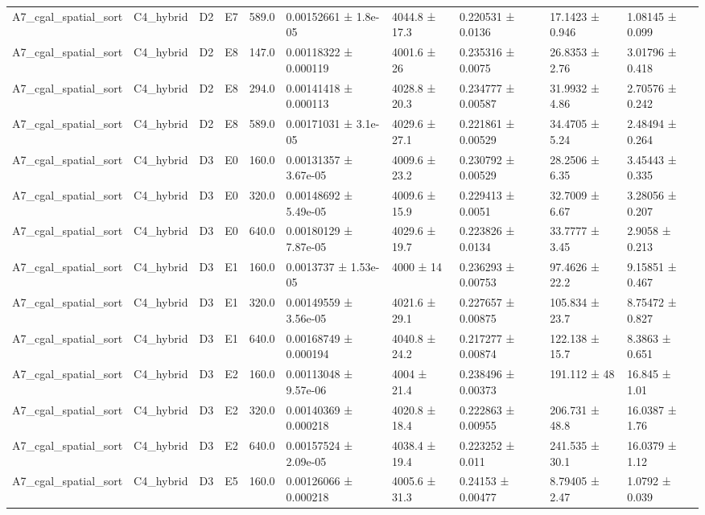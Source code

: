 \begin{table}
\begin{tabular}{llllllllll}
A7\_cgal\_spatial\_sort & C4\_hybrid & D2 & E7 & 589.0 & 0.00152661 ± 1.8e-05 & 4044.8 ± 17.3 & 0.220531 ± 0.0136 & 17.1423 ± 0.946 & 1.08145 ± 0.099 \\
A7\_cgal\_spatial\_sort & C4\_hybrid & D2 & E8 & 147.0 & 0.00118322 ± 0.000119 & 4001.6 ± 26 & 0.235316 ± 0.0075 & 26.8353 ± 2.76 & 3.01796 ± 0.418 \\
A7\_cgal\_spatial\_sort & C4\_hybrid & D2 & E8 & 294.0 & 0.00141418 ± 0.000113 & 4028.8 ± 20.3 & 0.234777 ± 0.00587 & 31.9932 ± 4.86 & 2.70576 ± 0.242 \\
A7\_cgal\_spatial\_sort & C4\_hybrid & D2 & E8 & 589.0 & 0.00171031 ± 3.1e-05 & 4029.6 ± 27.1 & 0.221861 ± 0.00529 & 34.4705 ± 5.24 & 2.48494 ± 0.264 \\
A7\_cgal\_spatial\_sort & C4\_hybrid & D3 & E0 & 160.0 & 0.00131357 ± 3.67e-05 & 4009.6 ± 23.2 & 0.230792 ± 0.00529 & 28.2506 ± 6.35 & 3.45443 ± 0.335 \\
A7\_cgal\_spatial\_sort & C4\_hybrid & D3 & E0 & 320.0 & 0.00148692 ± 5.49e-05 & 4009.6 ± 15.9 & 0.229413 ± 0.0051 & 32.7009 ± 6.67 & 3.28056 ± 0.207 \\
A7\_cgal\_spatial\_sort & C4\_hybrid & D3 & E0 & 640.0 & 0.00180129 ± 7.87e-05 & 4029.6 ± 19.7 & 0.223826 ± 0.0134 & 33.7777 ± 3.45 & 2.9058 ± 0.213 \\
A7\_cgal\_spatial\_sort & C4\_hybrid & D3 & E1 & 160.0 & 0.0013737 ± 1.53e-05 & 4000 ± 14 & 0.236293 ± 0.00753 & 97.4626 ± 22.2 & 9.15851 ± 0.467 \\
A7\_cgal\_spatial\_sort & C4\_hybrid & D3 & E1 & 320.0 & 0.00149559 ± 3.56e-05 & 4021.6 ± 29.1 & 0.227657 ± 0.00875 & 105.834 ± 23.7 & 8.75472 ± 0.827 \\
A7\_cgal\_spatial\_sort & C4\_hybrid & D3 & E1 & 640.0 & 0.00168749 ± 0.000194 & 4040.8 ± 24.2 & 0.217277 ± 0.00874 & 122.138 ± 15.7 & 8.3863 ± 0.651 \\
A7\_cgal\_spatial\_sort & C4\_hybrid & D3 & E2 & 160.0 & 0.00113048 ± 9.57e-06 & 4004 ± 21.4 & 0.238496 ± 0.00373 & 191.112 ± 48 & 16.845 ± 1.01 \\
A7\_cgal\_spatial\_sort & C4\_hybrid & D3 & E2 & 320.0 & 0.00140369 ± 0.000218 & 4020.8 ± 18.4 & 0.222863 ± 0.00955 & 206.731 ± 48.8 & 16.0387 ± 1.76 \\
A7\_cgal\_spatial\_sort & C4\_hybrid & D3 & E2 & 640.0 & 0.00157524 ± 2.09e-05 & 4038.4 ± 19.4 & 0.223252 ± 0.011 & 241.535 ± 30.1 & 16.0379 ± 1.12 \\
A7\_cgal\_spatial\_sort & C4\_hybrid & D3 & E5 & 160.0 & 0.00126066 ± 0.000218 & 4005.6 ± 31.3 & 0.24153 ± 0.00477 & 8.79405 ± 2.47 & 1.0792 ± 0.039 \\

\end{tabular}
\end{table}
